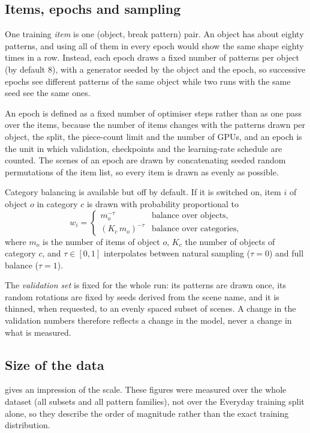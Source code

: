 \documentclass[11pt,a4paper]{article}
\theoremstyle{remark}
\begin{document}
\subsection{Items, epochs and sampling}
One training \emph{item} is one (object, break pattern) pair. An object has about eighty patterns, and using all of them in every epoch would show the same shape eighty times in a row. Instead, each epoch draws a fixed number of patterns per object (by default 8), with a generator seeded by the object and the epoch, so successive epochs see different patterns of the same object while two runs with the same seed see the same ones.

An epoch is defined as a fixed number of optimiser steps rather than as one pass over the items, because the number of items changes with the patterns drawn per object, the split, the piece-count limit and the number of GPUs, and an epoch is the unit in which validation, checkpoints and the learning-rate schedule are counted. The scenes of an epoch are drawn by concatenating seeded random permutations of the item list, so every item is drawn as evenly as possible.

Category balancing is available but off by default. If it is switched on, item $i$ of object $o$ in category $c$ is drawn with probability proportional to
\begin{equation}
  w_i=\begin{cases} m_o^{-\tau} & \text{balance over objects,}\\ (K_c\,m_o)^{-\tau} & \text{balance over categories,}\end{cases}
\end{equation}
where $m_o$ is the number of items of object $o$, $K_c$ the number of objects of category $c$, and $\tau\in[0,1]$ interpolates between natural sampling ($\tau=0$) and full balance ($\tau=1$).

The \emph{validation set} is fixed for the whole run: its patterns are drawn once, its random rotations are fixed by seeds derived from the scene name, and it is thinned, when requested, to an evenly spaced subset of scenes. A change in the validation numbers therefore reflects a change in the model, never a change in what is measured.

\subsection{Size of the data}
 gives an impression of the scale. These figures were measured over the whole dataset (all subsets and all pattern families), not over the Everyday training split alone, so they describe the order of magnitude rather than the exact training distribution.
\end{document}

